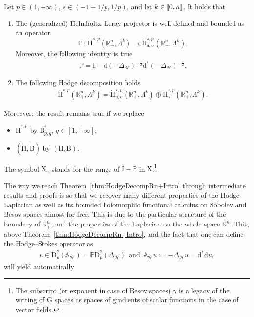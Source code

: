 \documentclass[AHL,Unicode,longabstracts,published]{cedram}
\newcommand{\bbP}{\mathbb{P}}
\newcommand{\bbA}{\mathbb{A}}
\newcommand{\bbR}{\mathbb{R}}
\newcommand{\rmH}{\mathrm{H}}%
\newcommand{\rmB}{\mathrm{B}}
\newcommand{\rmd}{\mathrm{d}}
\newcommand{\rmD}{\mathrm{D}}
\newcommand{\rmX}{\mathrm{X}}
\newcommand{\rmI}{\mathrm{I}}
\newcommand{\rmG}{\mathrm{G}}
\newcommand{\clH}{\mathcal{H}}
\newcommand{\fkn}{\mathfrak{n}}
\newcommand{\llbracket}{\mathopen{[\mkern -2.7mu[}}
\newcommand{\rrbracket}{\mathclose{]\mkern -2.7mu]}}
\newcommand{\llb}{\llbracket}
\newcommand{\rrb}{\rrbracket}
\begin{document}
\begin{theo}\label{thm:HodgeDecompRn+Intro}
Let $p\in(1,+\infty)$, $s\in(-1+1/p,1/p)$, and let $k\in\llb 0,n\rrb$. It holds that
\begin{enumerate}
\item\label{theo1.1.1} The (generalized) Helmholtz--Leray projector is well-defined and bounded as an operator
\[
\bbP\,:\, \dot{\rmH}^{s,p}\left(\bbR^n_+,\Lambda^k\right)\longrightarrow \dot{\rmH}^{s,p}_{\fkn,\sigma}\left(\bbR^n_+,\Lambda^k\right).
\]
Moreover, the following identity is true
\begin{align*}
\bbP = \rmI  - \rmd(-\Delta_{\clH})^{-\frac{1}{2}}\rmd^\ast(-\Delta_{\clH})^{-\frac{1}{2}} .
\end{align*}

\item\label{theo1.1.2} The following Hodge decomposition holds
\begin{align*}
\dot{\rmH}^{s,p}\left(\bbR^n_+,\Lambda^k\right) = \dot{\rmH}^{s,p}_{\fkn,\sigma}\left(\bbR^n_+,\Lambda^k\right) \oplus \dot{\rmH}^{s,p}_{\gamma}\left(\bbR^n_+,\Lambda^k\right).
\end{align*}
\end{enumerate}
Moreover, the result remains true if we replace
\begin{itemize}
\item $\dot{\rmH}^{s,p}$ by $\dot{\rmB}^{s}_{p,q}$, $q\in[1,+\infty]$;
\item $(\dot{\rmH},\dot{\rmB})$ by $({\rmH},{\rmB})$.
\end{itemize}
The symbol $\rmX _\gamma$ stands for the range of $\rmI -\bbP$ in $\rmX $.\footnote{The subscript (or exponent in case of Besov spaces) $\gamma$ is a legacy of the writing of $\rmG $ spaces as spaces of gradients of scalar functions in the case of vector fields.}
\end{theo}


The way we reach Theorem~\ref{thm:HodgeDecompRn+Intro} through intermediate results and proofs is so that we recover many different properties of the Hodge Laplacian as well as its bounded holomorphic functional calculus on Sobolev and Besov spaces almost for free. This is due to the particular structure of the boundary of $\bbR^n_+$, and the properties of the Laplacian on the whole space $\bbR^n$. This, above Theorem~\ref{thm:HodgeDecompRn+Intro}, and the fact that one can define the Hodge--Stokes operator as
\begin{align*}
u\in \dot{\rmD}^{s}_{p}({\bbA_\clH}) = \bbP\dot{\rmD}^{s}_{p}({\Delta_\clH})\,\text{ and }\,\bbA_{\clH} u:= -{\Delta_\clH} u = \rmd^{\ast}\rmd u,
\end{align*}
will yield automatically
\end{document}
